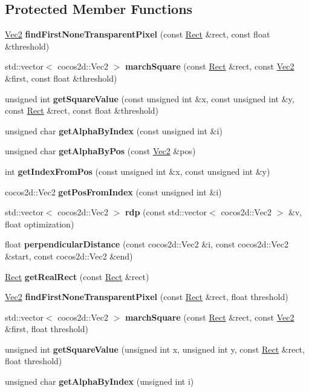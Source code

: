\subsection*{Protected Member Functions}
\begin{DoxyCompactItemize}
\item 
\hyperlink{classVec2}{Vec2} {\bfseries find\+First\+None\+Transparent\+Pixel} (const \hyperlink{classRect}{Rect} \&rect, const float \&threshold)
\item 
std\+::vector$<$ cocos2d\+::\+Vec2 $>$ {\bfseries march\+Square} (const \hyperlink{classRect}{Rect} \&rect, const \hyperlink{classVec2}{Vec2} \&first, const float \&threshold)
\item 
unsigned int {\bfseries get\+Square\+Value} (const unsigned int \&x, const unsigned int \&y, const \hyperlink{classRect}{Rect} \&rect, const float \&threshold)
\item 
unsigned char {\bfseries get\+Alpha\+By\+Index} (const unsigned int \&i)
\item 
unsigned char {\bfseries get\+Alpha\+By\+Pos} (const \hyperlink{classVec2}{Vec2} \&pos)
\item 
int {\bfseries get\+Index\+From\+Pos} (const unsigned int \&x, const unsigned int \&y)
\item 
cocos2d\+::\+Vec2 {\bfseries get\+Pos\+From\+Index} (const unsigned int \&i)
\item 
std\+::vector$<$ cocos2d\+::\+Vec2 $>$ {\bfseries rdp} (const std\+::vector$<$ cocos2d\+::\+Vec2 $>$ \&v, float optimization)
\item 
float {\bfseries perpendicular\+Distance} (const cocos2d\+::\+Vec2 \&i, const cocos2d\+::\+Vec2 \&start, const cocos2d\+::\+Vec2 \&end)
\item 
\hyperlink{classRect}{Rect} {\bfseries get\+Real\+Rect} (const \hyperlink{classRect}{Rect} \&rect)
\item 
\hyperlink{classVec2}{Vec2} {\bfseries find\+First\+None\+Transparent\+Pixel} (const \hyperlink{classRect}{Rect} \&rect, float threshold)
\item 
std\+::vector$<$ cocos2d\+::\+Vec2 $>$ {\bfseries march\+Square} (const \hyperlink{classRect}{Rect} \&rect, const \hyperlink{classVec2}{Vec2} \&first, float threshold)
\item 
unsigned int {\bfseries get\+Square\+Value} (unsigned int x, unsigned int y, const \hyperlink{classRect}{Rect} \&rect, float threshold)
\item 
unsigned char {\bfseries get\+Alpha\+By\+Index} (unsigned int i)

\end{DoxyCompactItemize}
